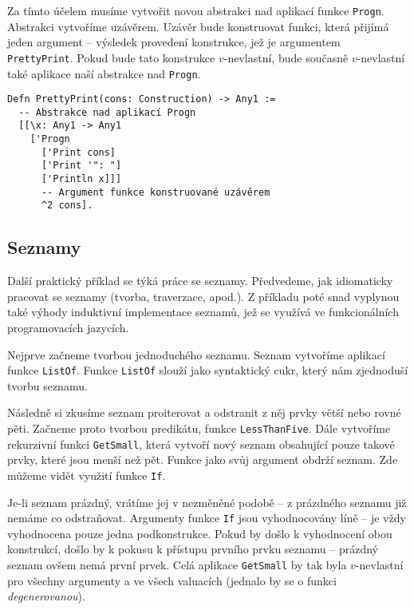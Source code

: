 Za tímto účelem musíme vytvořit novou abstrakci nad aplikací funkce \lstinline{Progn}. Abstrakci
vytvoříme uzávěrem. Uzávěr bude konstruovat funkci, která přijímá jeden argument -- výsledek
provedení konstrukce, jež je argumentem \lstinline{PrettyPrint}. Pokud bude tato konstrukce
$v$-nevlastní, bude současně $v$-nevlastní také aplikace naší abstrakce nad \lstinline{Progn}.

\begin{lstlisting}[caption={Funkce a uzávěry}]
Defn PrettyPrint(cons: Construction) -> Any1 :=
  -- Abstrakce nad aplikací Progn
  [[\x: Any1 -> Any1
    ['Progn
      ['Print cons]
      ['Print '": "]
      ['Println x]]]
      -- Argument funkce konstruované uzávěrem
      ^2 cons].
\end{lstlisting}

\subsection{Seznamy}

Další praktický příklad se týká práce se seznamy. Předvedeme, jak idiomaticky pracovat se seznamy
(tvorba, traverzace, apod.). Z příkladu poté snad vyplynou také výhody induktivní implementace
seznamů, jež se využívá ve funkcionálních programovacích jazycích.

Nejprve začneme tvorbou jednoduchého seznamu. Seznam vytvoříme aplikací funkce \lstinline{ListOf}.
Funkce \lstinline{ListOf} slouží jako syntaktický cukr, který nám zjednoduší tvorbu seznamu.

Následně si zkusíme seznam proiterovat a odstranit z něj prvky větší nebo rovné pěti. Začneme proto
tvorbou predikátu, funkce \lstinline{LessThanFive}. Dále vytvoříme rekurzivní funkci
\lstinline{GetSmall}, která vytvoří nový seznam obsahující pouze takové prvky, které jsou menší než
pět. Funkce jako svůj argument obdrží seznam. Zde můžeme vidět využití funkce \lstinline{If}.

Je-li seznam prázdný, vrátíme jej v nezměněné podobě -- z prázdného seznamu již nemáme co
odstraňovat. Argumenty funkce \lstinline{If} jsou vyhodnocovány líně -- je vždy vyhodnocena pouze
jedna podkonstrukce. Pokud by došlo k vyhodnocení obou konstrukcí, došlo by k pokusu k přístupu
prvního prvku seznamu -- prázdný seznam ovšem nemá první prvek. Celá aplikace \lstinline{GetSmall}
by tak byla $v$-nevlastní pro všechny argumenty a ve všech valuacích (jednalo by se o funkci
\textit{degenerovanou}).

